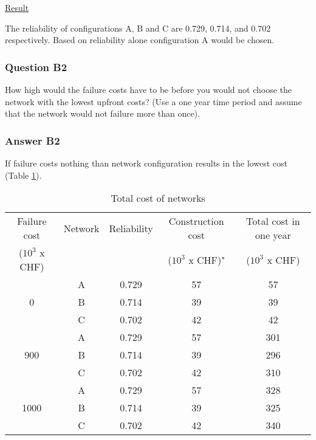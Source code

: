\underline{Result}

The reliability of configurations A, B and C are 0.729, 0.714, and 0.702
respectively. Based on reliability alone configuration A would be chosen.
%
\subsubsection{Question B2}
How high would the failure costs have to be before you would not choose the
network with the lowest upfront costs? (Use a one year time period and assume
that the network would not failure more than once).
%
\subsubsection{Answer B2}
If failure costs nothing than network configuration results in the lowest cost
(Table \ref{tbl-reliability-a:3}).


\begin{table}[h]
\caption{Total cost of networks}
\begin{tabular}{|l|l|l|l|l|}
\hline
\multicolumn{1}{|c|}{Failure cost} & \multicolumn{1}{c|}{Network} & \multicolumn{1}{c|}{Reliability} & \multicolumn{1}{c|}{Construction cost} & \multicolumn{1}{c|}{Total cost in one year} \\ 
\multicolumn{1}{|c|}{($10^3$ x CHF)} & \multicolumn{1}{c|}{} & \multicolumn{1}{c|}{} & \multicolumn{1}{c|}{($10^3$ x CHF)"} & \multicolumn{1}{c|}{($10^3$ x CHF)} \\ 
\hline
\multicolumn{1}{|c|}{} & \multicolumn{1}{c|}{A} & \multicolumn{1}{c|}{0.729} & \multicolumn{1}{c|}{57} & \multicolumn{1}{c|}{57} \\ 
\cline{2-5}
\multicolumn{1}{|c|}{0} & \multicolumn{1}{c|}{B} & \multicolumn{1}{c|}{0.714} & \multicolumn{1}{c|}{39} & \multicolumn{1}{c|}{39} \\ 
\cline{2-5}
\multicolumn{1}{|c|}{} & \multicolumn{1}{c|}{C} & \multicolumn{1}{c|}{0.702} & \multicolumn{1}{c|}{42} & \multicolumn{1}{c|}{42} \\ 
\hline
\multicolumn{1}{|c|}{} & \multicolumn{1}{c|}{A} & \multicolumn{1}{c|}{0.729} & \multicolumn{1}{c|}{57} & \multicolumn{1}{c|}{301} \\ 
\cline{2-5}
\multicolumn{1}{|c|}{900} & \multicolumn{1}{c|}{B} & \multicolumn{1}{c|}{0.714} & \multicolumn{1}{c|}{39} & \multicolumn{1}{c|}{296} \\ 
\cline{2-5}
\multicolumn{1}{|c|}{} & \multicolumn{1}{c|}{C} & \multicolumn{1}{c|}{0.702} & \multicolumn{1}{c|}{42} & \multicolumn{1}{c|}{310} \\ 
\hline
\multicolumn{1}{|c|}{} & \multicolumn{1}{c|}{A} & \multicolumn{1}{c|}{0.729} & \multicolumn{1}{c|}{57} & \multicolumn{1}{c|}{328} \\ 
\cline{2-5}
\multicolumn{1}{|c|}{1000} & \multicolumn{1}{c|}{B} & \multicolumn{1}{c|}{0.714} & \multicolumn{1}{c|}{39} & \multicolumn{1}{c|}{325} \\ 
\cline{2-5}
\multicolumn{1}{|c|}{} & \multicolumn{1}{c|}{C} & \multicolumn{1}{c|}{0.702} & \multicolumn{1}{c|}{42} & \multicolumn{1}{c|}{340} \\ 
\hline
\end{tabular}
\label{tbl-reliability-a:3}
\end{table}
